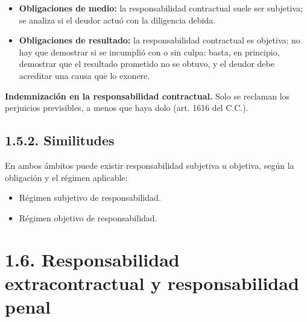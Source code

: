 \begin{itemize}
\item \textbf{Obligaciones de medio:} la responsabilidad contractual suele ser subjetiva; se analiza si el deudor actuó con la diligencia debida.
\item \textbf{Obligaciones de resultado:} la responsabilidad contractual es objetiva; no hay que demostrar si se incumplió con o sin culpa: basta, en principio, demostrar que el resultado prometido no se obtuvo, y el deudor debe acreditar una causa que lo exonere.
\end{itemize}
\textbf{Indemnización en la responsabilidad contractual.} Solo se reclaman los perjuicios previsibles, a menos que haya dolo (art. 1616 del C.C.).

\subsection{1.5.2. Similitudes}
En ambos ámbitos puede existir responsabilidad subjetiva u objetiva, según la obligación y el régimen aplicable:

\begin{itemize}
\item Régimen subjetivo de responsabilidad.
\item Régimen objetivo de responsabilidad.
\end{itemize}
\section{1.6. Responsabilidad extracontractual y responsabilidad penal}
